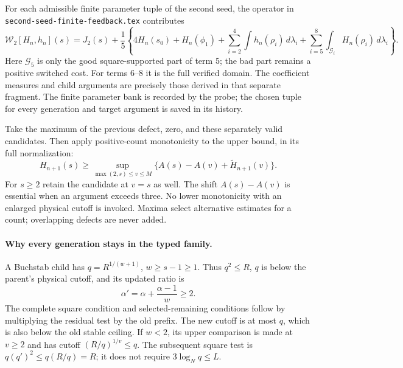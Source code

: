 For each admissible finite parameter tuple of the second seed, the
operator in \texttt{second-seed-finite-feedback.tex} contributes
\[
 \mathcal W_2[H_n,h_n](s)=J_2(s)+\frac15
 \left\{4H_n(s_0)+H_n(\phi_1)
       +\sum_{i=2}^4\int h_n(\rho_i)\,d\lambda_i
       +\sum_{i=5}^8\int_{\mathcal G_i}H_n(\rho_i)\,d\lambda_i
 \right\}.
\]
Here $\mathcal G_5$ is only the good square-supported part of term 5;
the bad part remains a positive switched cost. For terms 6--8 it is
the full verified domain. The coefficient measures and child
arguments are precisely those derived in that separate fragment.
The finite parameter bank is recorded by the probe; the chosen tuple
for every generation and target argument is saved in its history.

Take the maximum of the previous defect, zero, and these separately
valid candidates. Then apply positive-count monotonicity to the
upper bound, in its full normalization:
\[
 H_{n+1}(s)\ge
 \sup_{\max(2,s)\le v\le M}
       \{A(s)-A(v)+\widetilde H_{n+1}(v)\}.
\]
For $s\ge2$ retain the candidate at $v=s$ as well. The shift
$A(s)-A(v)$ is essential when an argument exceeds three. No lower
monotonicity with an enlarged physical cutoff is invoked. Maxima
select alternative estimates for a count; overlapping defects are
never added.

\paragraph{Why every generation stays in the typed family.}
A Buchstab child has $q=R^{1/(w+1)}$, $w\ge s-1\ge1$.
Thus $q^2\le R$, $q$ is below the parent's physical cutoff, and
its updated ratio is
\[
 \alpha' =\alpha+\frac{\alpha-1}{w}\ge2.
\]
The complete square condition and selected-remaining conditions
follow by multiplying the residual test by the old prefix.
The new cutoff is at most $q$, which is also below the old stable
ceiling. If $w<2$, its upper comparison is made at $v\ge2$ and
has cutoff $(R/q)^{1/v}\le q$. The subsequent square test is
$q(q')^2\le q(R/q)=R$; it does not require $3\log_Nq\le L$.

